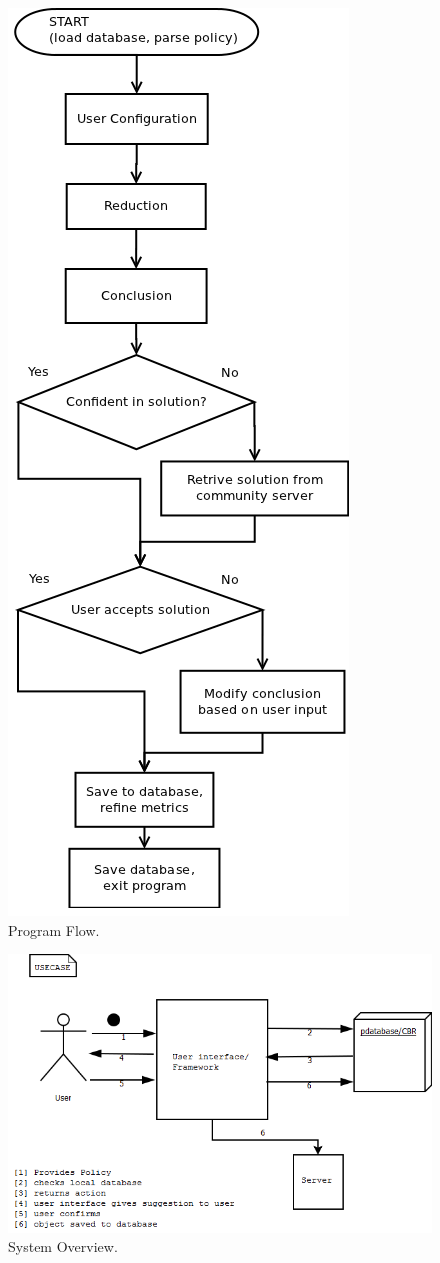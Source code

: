 \begin{figure}[htbp]
\begin{center}
\includegraphics[width = 0.50 \textwidth ]{DesignReport/uml/flowchart.png}
\caption{Program Flow.}
\label{DesignFlowChart}
\end{center}
\end{figure}


\begin{figure}[htbp]
\begin{center}
\includegraphics[width = \textwidth]{DesignReport/uml/Case.png}
\caption{System Overview.}
\label{SystemOverview}
\end{center}
\end{figure}

